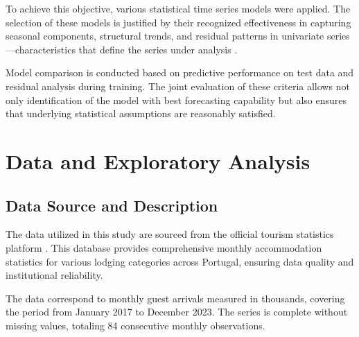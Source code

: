 \documentclass[journal]{IEEEtran}
\begin{document}
To achieve this objective, various statistical time series models were applied. The selection of these models is justified by their recognized effectiveness in capturing seasonal components, structural trends, and residual patterns in univariate series—characteristics that define the series under analysis \cite{shumway2017time}.

Model comparison is conducted based on predictive performance on test data and residual analysis during training. The joint evaluation of these criteria allows not only identification of the model with best forecasting capability but also ensures that underlying statistical assumptions are reasonably satisfied.

\section{Data and Exploratory Analysis}

\subsection{Data Source and Description}

The data utilized in this study are sourced from the official tourism statistics platform \cite{ine2024tourism}. This database provides comprehensive monthly accommodation statistics for various lodging categories across Portugal, ensuring data quality and institutional reliability.

The data correspond to monthly guest arrivals measured in thousands, covering the period from January 2017 to December 2023. The series is complete without missing values, totaling 84 consecutive monthly observations.
\end{document}
